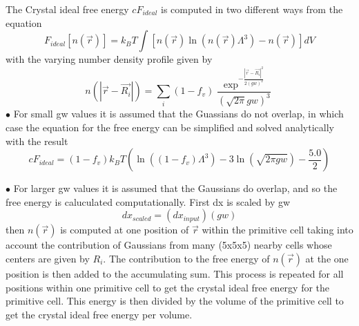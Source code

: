 \documentclass[12pt]{article}
\begin{document}
The Crystal ideal free energy $cF_{ideal}$ is computed in two different ways from the equation 
\begin{displaymath}{F_{ideal}[n(\vec{r})]= k_BT\int[n(\vec{r})\ln(n(\vec{r})\Lambda^3)-n(\vec{r})]dV}\end{displaymath}
with the varying number density profile given by 
\begin{displaymath}{n(|\vec{r}-\vec{R_i}|)=\sum_i{(1-f_v)\frac{\exp^{-\frac{{|\vec{r}-\vec{R_i}|}^2}{2{(gw)}^2}}}{\left(\sqrt{2\pi}gw\right)^3}}}\end{displaymath}
\newline $\bullet$ For small gw values it is assumed that the Guassians do not overlap, in which case the equation for the free energy can be simplified and solved analytically with the result
\begin{displaymath}{cF_{ideal}=(1-f_v)k_BT\left(\ln((1-f_v)\Lambda^3)-3\ln(\sqrt{2\pi{gw}})-\frac{5.0}{2}\right)}\end{displaymath}


$\bullet$ For larger gw values it is assumed that the Gaussians do overlap, and so the free energy is caluculated computationally. First dx is scaled by gw
\begin{displaymath}{dx_{scaled}=(dx_{input})(gw)}\end{displaymath}
then $n(\vec{r})$ is computed at one position of $\vec{r}$ within the primitive cell taking into account the contribution of Gaussians from many (5x5x5) nearby cells whose centers are given by $R_i$.
The contribution to the free energy of $n(\vec{r})$ at the one position is then added to the accumulating sum.
This process is repeated for all positions within one primitive cell to get the crystal ideal free energy for the primitive cell. This energy is then divided by the volume of the primitive cell to get the crystal ideal free energy per volume.
\end{document}
